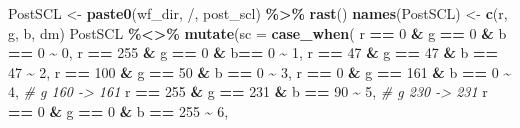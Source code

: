 \documentclass[
]{article}
\newenvironment{Shaded}{\begin{snugshade}}{\end{snugshade}}
\newcommand{\AttributeTok}[1]{\textcolor[rgb]{0.13,0.29,0.53}{#1}}
\newcommand{\CommentTok}[1]{\textcolor[rgb]{0.56,0.35,0.01}{\textit{#1}}}
\newcommand{\DecValTok}[1]{\textcolor[rgb]{0.00,0.00,0.81}{#1}}
\newcommand{\FunctionTok}[1]{\textcolor[rgb]{0.13,0.29,0.53}{\textbf{#1}}}
\newcommand{\NormalTok}[1]{#1}
\newcommand{\OtherTok}[1]{\textcolor[rgb]{0.56,0.35,0.01}{#1}}
\newcommand{\SpecialCharTok}[1]{\textcolor[rgb]{0.81,0.36,0.00}{\textbf{#1}}}
\newcommand{\StringTok}[1]{\textcolor[rgb]{0.31,0.60,0.02}{#1}}
\begin{document}
\begin{Shaded}
\begin{Highlighting}[]
\NormalTok{        PostSCL }\OtherTok{\textless{}{-}} \FunctionTok{paste0}\NormalTok{(wf\_dir, }\StringTok{\textquotesingle{}/\textquotesingle{}}\NormalTok{, post\_scl) }\SpecialCharTok{\%\textgreater{}\%} 
                    \FunctionTok{rast}\NormalTok{() }
        \FunctionTok{names}\NormalTok{(PostSCL) }\OtherTok{\textless{}{-}} \FunctionTok{c}\NormalTok{(}\StringTok{\textquotesingle{}r\textquotesingle{}}\NormalTok{, }\StringTok{\textquotesingle{}g\textquotesingle{}}\NormalTok{, }\StringTok{\textquotesingle{}b\textquotesingle{}}\NormalTok{, }\StringTok{\textquotesingle{}dm\textquotesingle{}}\NormalTok{)}
\NormalTok{        PostSCL }\SpecialCharTok{\%\textless{}\textgreater{}\%}
          \FunctionTok{mutate}\NormalTok{(}\AttributeTok{sc =} \FunctionTok{case\_when}\NormalTok{(}
\NormalTok{            r }\SpecialCharTok{==} \DecValTok{0} \SpecialCharTok{\&}\NormalTok{ g }\SpecialCharTok{==} \DecValTok{0} \SpecialCharTok{\&}\NormalTok{ b  }\SpecialCharTok{==} \DecValTok{0} \SpecialCharTok{\textasciitilde{}} \DecValTok{0}\NormalTok{, }
\NormalTok{            r }\SpecialCharTok{==} \DecValTok{255} \SpecialCharTok{\&}\NormalTok{ g }\SpecialCharTok{==} \DecValTok{0} \SpecialCharTok{\&}\NormalTok{ b}\SpecialCharTok{==} \DecValTok{0} \SpecialCharTok{\textasciitilde{}} \DecValTok{1}\NormalTok{, }
\NormalTok{            r }\SpecialCharTok{==} \DecValTok{47} \SpecialCharTok{\&}\NormalTok{ g }\SpecialCharTok{==} \DecValTok{47} \SpecialCharTok{\&}\NormalTok{ b }\SpecialCharTok{==} \DecValTok{47} \SpecialCharTok{\textasciitilde{}} \DecValTok{2}\NormalTok{,}
\NormalTok{            r }\SpecialCharTok{==} \DecValTok{100} \SpecialCharTok{\&}\NormalTok{ g }\SpecialCharTok{==} \DecValTok{50} \SpecialCharTok{\&}\NormalTok{ b }\SpecialCharTok{==} \DecValTok{0} \SpecialCharTok{\textasciitilde{}} \DecValTok{3}\NormalTok{,}
\NormalTok{            r }\SpecialCharTok{==} \DecValTok{0} \SpecialCharTok{\&}\NormalTok{ g }\SpecialCharTok{==} \DecValTok{161} \SpecialCharTok{\&}\NormalTok{ b }\SpecialCharTok{==} \DecValTok{0} \SpecialCharTok{\textasciitilde{}} \DecValTok{4}\NormalTok{,        }\CommentTok{\# g 160 {-}\textgreater{} 161}
\NormalTok{            r }\SpecialCharTok{==} \DecValTok{255} \SpecialCharTok{\&}\NormalTok{ g }\SpecialCharTok{==} \DecValTok{231} \SpecialCharTok{\&}\NormalTok{ b }\SpecialCharTok{==} \DecValTok{90} \SpecialCharTok{\textasciitilde{}} \DecValTok{5}\NormalTok{,     }\CommentTok{\# g 230 {-}\textgreater{} 231}
\NormalTok{            r }\SpecialCharTok{==} \DecValTok{0} \SpecialCharTok{\&}\NormalTok{ g }\SpecialCharTok{==} \DecValTok{0} \SpecialCharTok{\&}\NormalTok{ b }\SpecialCharTok{==} \DecValTok{255} \SpecialCharTok{\textasciitilde{}} \DecValTok{6}\NormalTok{, }

\end{Highlighting}
\end{Shaded}
\end{document}
